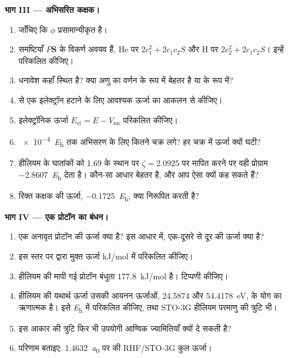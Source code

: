 \begin{problem}
\medskip\noindent\textbf{भाग III --- अभिसरित कक्षक।}
\begin{enumerate}[resume]
  \item जाँचिए कि $\phi$ प्रसामान्यीकृत है।
  \item समष्टियाँ $P\mathbf S$ के विकर्ण अवयव हैं, He पर $2c_1^2 + 2c_1c_2S$
        और H पर $2c_2^2 + 2c_1c_2S$। इन्हें परिकलित कीजिए।
  \item धनावेश कहाँ स्थित है? क्या अणु का वर्णन
         के रूप में बेहतर है या  के रूप में?
  \item {} से एक इलेक्ट्रॉन हटाने के लिए आवश्यक ऊर्जा का आकलन
         से कीजिए।
  \item इलेक्ट्रॉनिक ऊर्जा $E_{\mathrm{el}} = E - V_{\mathrm{nn}}$ परिकलित कीजिए।
  \item \qty{e-4}{\hartree} तक अभिसरण के लिए कितने चक्र लगे? हर चक्र में
        ऊर्जा क्यों घटी?
  \item हीलियम के घातांकों को 1.69 के स्थान पर $\zeta = 2.0925$ पर मापित करने पर
        वही प्रोग्राम \qty{-2.8607}{\hartree} देता है। कौन-सा आधार बेहतर है, और
        आप ऐसा क्यों कह सकते हैं?
  \item रिक्त कक्षक की ऊर्जा, \qty{-0.1725}{\hartree}, क्या निरूपित करती है?
\end{enumerate}

\medskip\noindent\textbf{भाग IV --- एक प्रोटॉन का बंधन।}
\begin{enumerate}[resume]
  \item एक अनावृत प्रोटॉन की ऊर्जा क्या है? इस आधार में, एक-दूसरे से दूर
         की ऊर्जा क्या है?
  \item इस स्तर पर  द्वारा मुक्त ऊर्जा
        \unit{kJ/mol} में परिकलित कीजिए।
  \item हीलियम की मापी गई प्रोटॉन बंधुता \qty{177.8}{kJ/mol} है।
        टिप्पणी कीजिए।
  \item हीलियम की यथार्थ ऊर्जा उसकी आयनन ऊर्जाओं, 24.5874 और \qty{54.4178}{eV},
        के योग का ऋणात्मक है। इसे \unit{\hartree} में परिकलित कीजिए, तथा
        STO-3G हीलियम परमाणु की त्रुटि भी।
  \item इस आकार की त्रुटि फिर भी उपयोगी आण्विक
        ज्यामितियाँ क्यों दे सकती है?
  \item परिणाम बताइए: \qty{1.4632}{\bohr} पर  की RHF/STO-3G कुल ऊर्जा।
\end{enumerate}
\end{problem}
